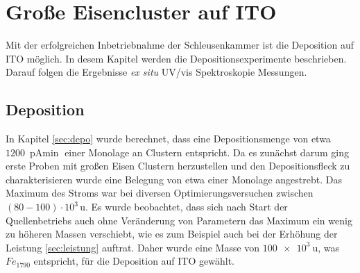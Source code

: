 \chapter{Große Eisencluster auf ITO}
Mit der erfolgreichen Inbetriebnahme der Schleusenkammer ist die Deposition auf ITO möglich. In desem Kapitel werden die Depositionsexperimente beschrieben.
Darauf folgen die Ergebnisse \textit{ex situ} UV/vis Spektroskopie Messungen. 


\section{Deposition}
In Kapitel \ref{sec:depo} wurde berechnet, dass eine Depositionsmenge von etwa $\SI{1200}{\pA\min}$ einer Monolage an Clustern entspricht.
Da es zunächst darum ging erste Proben mit großen Eisen Clustern herzustellen und den Depositionsfleck zu charakterisieren wurde eine Belegung von etwa einer Monolage angestrebt. 
Das Maximum des Stroms war bei diversen Optimierungsversuchen zwischen $(80-100)\cdot 10^3\,\text{u}$.
Es wurde beobachtet, dass sich nach Start der Quellenbetriebs auch ohne Veränderung von Parametern das Maximum ein wenig zu höheren Massen verschiebt, wie es zum Beispiel auch bei der Erhöhung der Leistung \ref{sec:leistung} auftrat.
Daher wurde eine Masse von $\SI{100e3}{\amu}$, was $Fe_{1790}$ entspricht, für die Deposition auf ITO gewählt.\\

